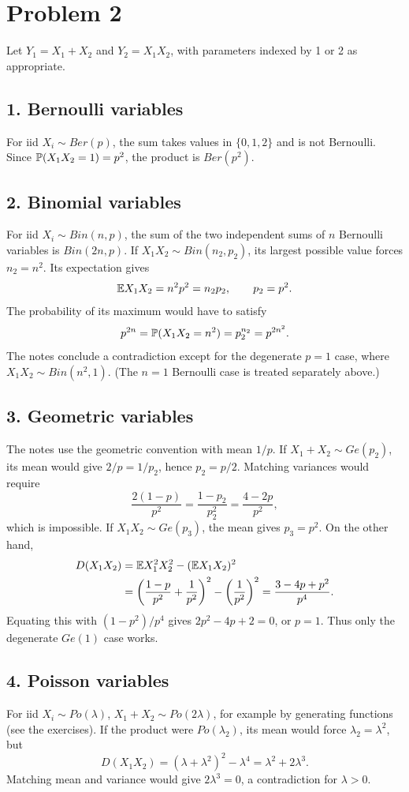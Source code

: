 \documentclass[a4paper]{article}
\begin{document}
\section*{Problem 2}
Let $Y_1=X_1+X_2$ and $Y_2=X_1X_2$, with parameters indexed by 1 or 2 as appropriate.
\subsection*{1. Bernoulli variables}
For iid $X_i\sim Ber(p)$, the sum takes values in $\{0,1,2\}$ and is not Bernoulli. Since $\P(X_1X_2=1)=p^2$, the product is $Ber(p^2)$.
\subsection*{2. Binomial variables}
For iid $X_i\sim Bin(n,p)$, the sum of the two independent sums of $n$ Bernoulli variables is $Bin(2n,p)$.
If $X_1X_2\sim Bin(n_2,p_2)$, its largest possible value forces $n_2=n^2$. Its expectation gives
\[\E X_1X_2=n^2p^2=n_2p_2,\qquad p_2=p^2.\]
The probability of its maximum would have to satisfy
\[p^{2n}=\P(X_1X_2=n^2)=p_2^{n_2}=p^{2n^2}.\]
The notes conclude a contradiction except for the degenerate $p=1$ case, where $X_1X_2\sim Bin(n^2,1)$. (The $n=1$ Bernoulli case is treated separately above.)
\subsection*{3. Geometric variables}
The notes use the geometric convention with mean $1/p$. If $X_1+X_2\sim Ge(p_2)$, its mean would give $2/p=1/p_2$, hence $p_2=p/2$. Matching variances would require
\[\frac{2(1-p)}{p^2}=\frac{1-p_2}{p_2^2}=\frac{4-2p}{p^2},\]
which is impossible.
If $X_1X_2\sim Ge(p_3)$, the mean gives $p_3=p^2$. On the other hand,
\begin{align*}
D(X_1X_2)&=\E X_1^2X_2^2-(\E X_1X_2)^2\\
&=\left(\frac{1-p}{p^2}+\frac1{p^2}\right)^2-\left(\frac1{p^2}\right)^2
=\frac{3-4p+p^2}{p^4}.
\end{align*}
Equating this with $(1-p^2)/p^4$ gives $2p^2-4p+2=0$, or $p=1$. Thus only the degenerate $Ge(1)$ case works.
\subsection*{4. Poisson variables}
For iid $X_i\sim Po(\lambda)$, $X_1+X_2\sim Po(2\lambda)$, for example by generating functions (see the exercises). If the product were $Po(\lambda_2)$, its mean would force $\lambda_2=\lambda^2$, but
\[D(X_1X_2)=(\lambda+\lambda^2)^2-\lambda^4=\lambda^2+2\lambda^3.\]
Matching mean and variance would give $2\lambda^3=0$, a contradiction for $\lambda>0$.
\end{document}
